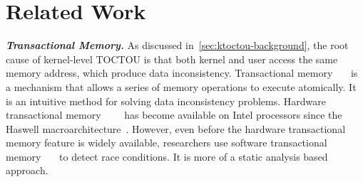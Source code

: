 \section{Related Work}
\label{sec:ktoctou-relatedwork}




%
%


\textbf{\textit{Transactional Memory.}} As discussed in~\autoref{sec:ktoctou-background}, the root cause of kernel-level TOCTOU is that both kernel and user access the same memory address, which produce data inconsistency. Transactional memory~\cite{shavit1997software}~\cite{rajwar2012intel}~\cite{herlihy1993transactional} is a mechanism that allows a series of memory operations to execute atomically. It is an intuitive method for solving data inconsistency problems. Hardware transactional memory~\cite{haring2012ibm}~\cite{jacobi2012transactional}~\cite{click2009azul}~\cite{dice2009early} has become available on Intel processors since the Haswell macroarchitecture~\cite{rajwar2012intel}. However, even before the hardware transactional memory feature is widely available, researchers use software transactional memory~\cite{kestor2014trex}~\cite{abadi2008semantics}~\cite{gupta2009using} to detect race conditions. It is more of a static analysis based approach.



